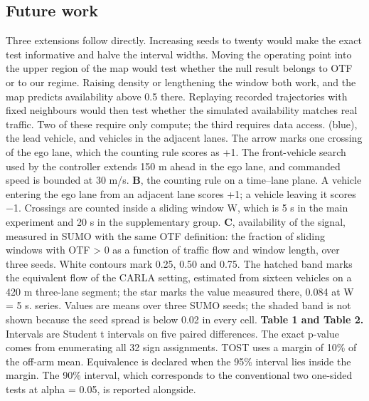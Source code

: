 \documentclass[journal]{IEEEtran}
\begin{document}
\subsection{Future work}
Three extensions follow directly. Increasing seeds to twenty would make the exact test informative and
halve the interval widths. Moving the operating point into the upper region of the map would test
whether the null result belongs to OTF or to our regime. Raising density or lengthening the window
both work, and the map predicts availability above 0.5 there. Replaying
recorded trajectories with fixed neighbours would then test whether the simulated availability matches
real traffic. Two of these require only compute; the third requires data access.
(blue), the lead vehicle, and vehicles in the adjacent lanes. The arrow marks one crossing of the ego
lane, which the counting rule scores as +1. The front-vehicle search used by the controller extends
150 m ahead in the ego lane, and commanded speed is bounded at 30 m/s. \textbf{B}, the counting rule on a
time--lane plane. A vehicle entering the ego lane from an adjacent lane scores +1; a vehicle leaving it
scores $-$1. Crossings are counted inside a sliding window W, which is 5 s in the main experiment and
20 s in the supplementary group. \textbf{C}, availability of the signal, measured in SUMO with the same OTF
definition: the fraction of sliding windows with OTF > 0 as a function of traffic flow and window
length, over three seeds. White contours mark 0.25, 0.50 and 0.75. The hatched band marks the
equivalent flow of the CARLA setting, estimated from sixteen vehicles on a 420 m three-lane segment;
the star marks the value measured there, 0.084 at W = 5 s.
series. Values are means over three SUMO seeds; the shaded band is not shown because the seed spread is
below 0.02 in every cell.
\textbf{Table 1 and Table 2.} Intervals are Student t intervals on five paired differences. The exact p-value
comes from enumerating all 32 sign assignments. TOST uses a margin of 10\% of the off-arm mean.
Equivalence is declared when the 95\% interval lies inside the margin. The 90\% interval, which
corresponds to the conventional two one-sided tests at alpha = 0.05, is reported alongside.
\end{document}

